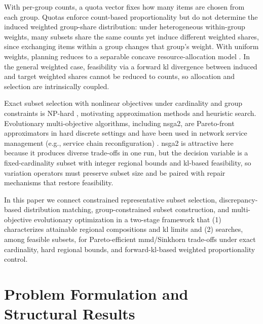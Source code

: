\documentclass[10pt,journal]{IEEEtran}
\newcommand{\1}{\mathbf{1}}
\theoremstyle{ieeethm}
\begin{document}
With per-group counts, a quota vector fixes how many items are chosen from each group. Quotas enforce count-based proportionality but do not determine the induced weighted group-share distribution: under heterogeneous within-group weights, many subsets share the same counts yet induce different weighted shares, since exchanging items within a group changes that group's weight. With uniform weights, planning reduces to a separable concave resource-allocation model \cite{ibaraki1988resource,murota2003dca,federgruen1986greedy}. In the general weighted case, feasibility via a forward \gls{kl} divergence between induced and target weighted shares cannot be reduced to counts, so allocation and selection are intrinsically coupled.

Exact subset selection with nonlinear objectives under cardinality and group constraints is NP-hard \cite{garey1979np,pardalos1991qp}, motivating approximation methods and heuristic search. Evolutionary multi-objective algorithms, including \gls{nsga2}, are Pareto-front approximators in hard discrete settings \cite{deb2001moea,deb2002nsga2,coello2007moea} and have been used in network service management (e.g., service chain reconfiguration) \cite{alizadehnoghani2023moeasfc}. \gls{nsga2} is attractive here because it produces diverse trade-offs in one run, but the decision variable is a fixed-cardinality subset with integer regional bounds and \gls{kl}-based feasibility, so variation operators must preserve subset size and be paired with repair mechanisms that restore feasibility.

In this paper we connect constrained representative subset selection, discrepancy-based distribution matching, group-constrained subset construction, and multi-objective evolutionary optimization in a two-stage framework that (1) characterizes attainable regional compositions and \gls{kl} limits and (2) searches, among feasible subsets, for Pareto-efficient \gls{mmd}/Sinkhorn trade-offs under exact cardinality, hard regional bounds, and forward-\gls{kl}-based weighted proportionality control.

\section{Problem Formulation and Structural Results}
\label{sec:formulation}
\end{document}
